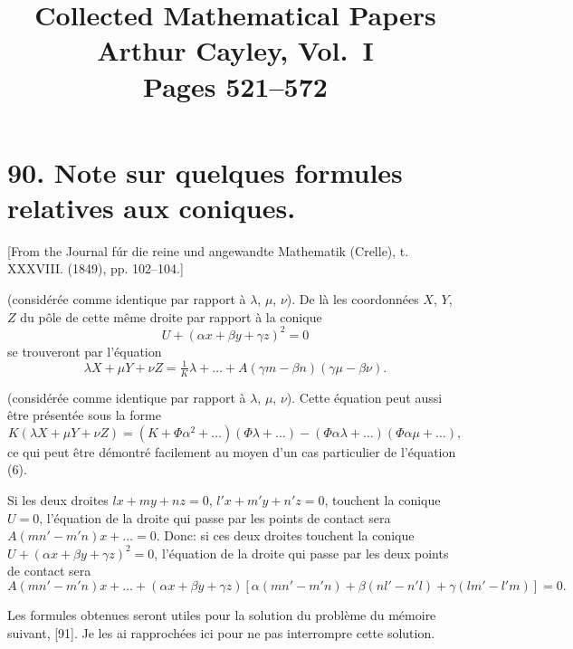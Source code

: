 \documentclass[12pt,a4paper]{article}
\title{\textbf{Collected Mathematical Papers}\\[0.5em]
\Large Arthur Cayley, Vol.~I\\[0.5em]
\large Pages 521--572}
\author{}
\date{}
\theoremstyle{definition}
\begin{document}
\maketitle
\thispagestyle{empty}

\tableofcontents
\newpage


\section*{90. Note sur quelques formules relatives aux coniques.}

[From the Journal f\'{u}r die reine und angewandte Mathematik (Crelle), t. XXXVIII. (1849), pp. 102--104.]

(consid\'{e}r\'{e}e comme identique par rapport \`{a} $\lambda$, $\mu$, $\nu$). De l\`{a} les coordonn\'{e}es $X$, $Y$, $Z$ du p\^{o}le de cette m\^{e}me droite par rapport \`{a} la conique
\[
U + (\alpha x + \beta y + \gamma z)^2 = 0
\]
se trouveront par l'\'{e}quation
\[
\lambda X + \mu Y + \nu Z = \tfrac{1}{K}\lambda + \ldots + A(\gamma m - \beta n)(\gamma \mu - \beta \nu).
\]
\begin{equation}\tag{11}
\end{equation}

(consid\'{e}r\'{e}e comme identique par rapport \`{a} $\lambda$, $\mu$, $\nu$). Cette \'{e}quation peut aussi \^{e}tre pr\'{e}sent\'{e}e sous la forme
\begin{equation}\tag{12}
K(\lambda X + \mu Y + \nu Z) = (K + \Phi \alpha^2 + \ldots)(\Phi \lambda + \ldots) - (\Phi \alpha \lambda + \ldots)(\Phi \alpha \mu + \ldots),
\end{equation}
ce qui peut \^{e}tre d\'{e}montr\'{e} facilement au moyen d'un cas particulier de l'\'{e}quation (6).

Si les deux droites $lx + my + nz = 0$, $l'x + m'y + n'z = 0$, touchent la conique $U = 0$, l'\'{e}quation de la droite qui passe par les points de contact sera $A(mn' - m'n)x + \ldots = 0$. Donc: si ces deux droites touchent la conique $U + (\alpha x + \beta y + \gamma z)^2 = 0$, l'\'{e}quation de la droite qui passe par les deux points de contact sera
\begin{equation}\tag{13}
A(mn' - m'n)x + \ldots + (\alpha x + \beta y + \gamma z)[\alpha(mn' - m'n) + \beta(nl' - n'l) + \gamma(lm' - l'm)] = 0.
\end{equation}

Les formules obtenues seront utiles pour la solution du probl\`{e}me du m\'{e}moire suivant, [91]. Je les ai rapproch\'{e}es ici pour ne pas interrompre cette solution.
\end{document}
